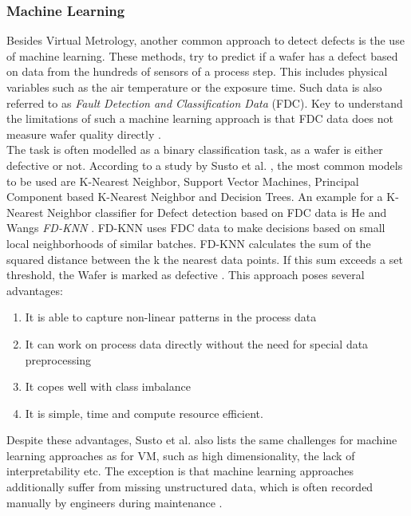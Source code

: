 \documentclass{Academic}
\begin{document}
    \subsubsection{Machine Learning}
    Besides Virtual Metrology, another common approach to detect defects is the use of machine learning. These methods, try to predict if a wafer has a defect based on data from the hundreds of sensors of a process step. This includes physical variables such as the air temperature or the exposure time. Such data is also referred to as \textit{Fault Detection and Classification Data} (FDC). Key to understand the limitations of such a machine learning approach is that FDC data does not measure wafer quality directly \cite{kim_machine_2012}. \\
    The task is often modelled as a binary classification task, as a wafer is either defective or not. According to a study by Susto et al. \cite{susto_automatic_2012}, the most common models to be used are K-Nearest Neighbor, Support Vector Machines, Principal Component based K-Nearest Neighbor and Decision Trees. An example for a K-Nearest Neighbor classifier for Defect detection based on FDC data is He and Wangs \textit{FD-KNN} \cite{he_fault_2007}. FD-KNN uses FDC data to make decisions based on small local neighborhoods of similar batches. FD-KNN calculates the sum of the squared distance between the k the nearest data points. If this sum exceeds a set threshold, the Wafer is marked as defective \cite{he_fault_2007}. This approach poses several advantages:
    \begin{enumerate}
        \item It is able to capture non-linear patterns in the process data
        \item It can work on process data directly without the need for special data preprocessing
        \item It copes well with class imbalance
        \item It is simple, time and compute resource efficient.
    \end{enumerate}
    Despite these advantages, Susto et al. also lists the same challenges for machine learning approaches as for VM, such as high dimensionality, the lack of interpretability etc. The exception is that machine learning approaches additionally suffer from missing unstructured data, which is often recorded manually by engineers during maintenance \cite{susto_automatic_2012}. \\
\end{document}
